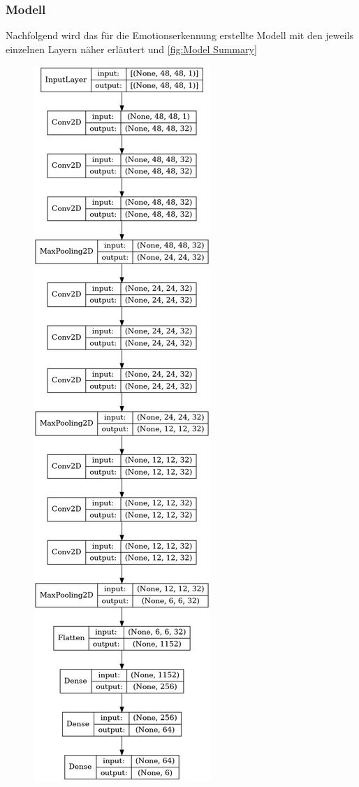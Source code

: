 \documentclass[12pt, a4paper]{scrbook}
\begin{document}
\subsubsection{Modell}
Nachfolgend wird das für die Emotionserkennung erstellte Modell mit den jeweils einzelnen Layern näher erläutert und \ref{fig:Model Summary}
\begin{figure}[h]
\includegraphics[viewport=0 1177 300 1844]{Bilder/ModelSummary.png}
\end{figure}
\end{document}
